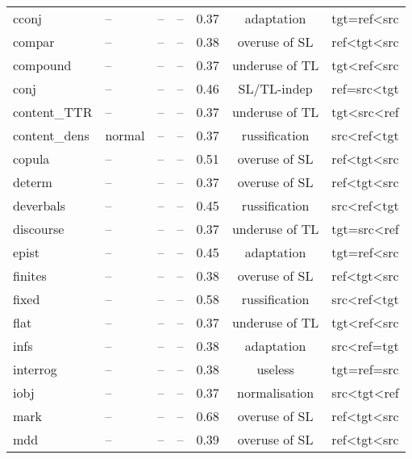 \begin{longtable}{l|p{2cm}p{2cm}p{1.5cm}ccc}
	cconj         & --     & --     & --    & 0.37 & adaptation     & tgt=ref\textless{}src           \\
	compar        & --     & --     & --    & 0.38 & overuse of SL  & ref\textless{}tgt\textless{}src \\
	compound      & --     & --     & --    & 0.37 & underuse of TL  & tgt\textless{}ref\textless{}src \\
	conj          & --     & --     & --    & 0.46 & SL/TL-indep    & ref=src\textless{}tgt           \\
	content\_TTR  & --     & --     & --    & 0.37 & underuse of TL & tgt\textless{}src\textless{}ref \\
	content\_dens & normal & --     & --    & 0.37 & russification  & src\textless{}ref\textless{}tgt \\
	copula        & --     & --     & --    & 0.51 & overuse of SL  & ref\textless{}tgt\textless{}src \\
	determ        & --     & --     & --    & 0.37 & overuse of SL  & ref\textless{}tgt\textless{}src \\
	deverbals     & --     & --     & --    & 0.45 & russification  & src\textless{}ref\textless{}tgt \\
	discourse     & --     & --     & --    & 0.37 & underuse of TL & tgt=src\textless{}ref           \\
	epist         & --     & --     & --    & 0.45 & adaptation     & tgt=ref\textless{}src           \\
	finites       & --     & --     & --    & 0.38 & overuse of SL  & ref\textless{}tgt\textless{}src \\
	fixed         & --     & --     & --    & 0.58 & russification  & src\textless{}ref\textless{}tgt \\
	flat          & --     & --     & --    & 0.37 & underuse of TL  & tgt\textless{}ref\textless{}src \\
	infs          & --     & --     & --    & 0.38 & adaptation     & src\textless{}ref=tgt        \\
	interrog      & --     & --     & --    & 0.38 & useless        & tgt=ref=src                     \\
	iobj          & --     & --     & --    & 0.37 & normalisation  & src\textless{}tgt\textless{}ref \\
	mark          & --     & --     & --    & 0.68 & overuse of SL  & ref\textless{}tgt\textless{}src \\
	mdd           & --     & --     & --    & 0.39 & overuse of SL  & ref\textless{}tgt\textless{}src \\

\end{longtable}
